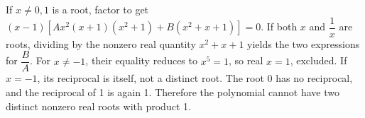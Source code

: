 If $x\ne0,1$ is a root, factor to get $(x-1)[Ax^2(x+1)(x^2+1)+B(x^2+x+1)]=0$. If both $x$ and $\dfrac{1}{x}$ are roots, dividing by the nonzero real quantity $x^2+x+1$ yields the two expressions for $\dfrac{B}{A}$. For $x\ne-1$, their equality reduces to $x^5=1$, so real $x=1$, excluded. If $x=-1$, its reciprocal is itself, not a distinct root. The root 0 has no reciprocal, and the reciprocal of 1 is again 1. Therefore the polynomial cannot have two distinct nonzero real roots with product 1.
